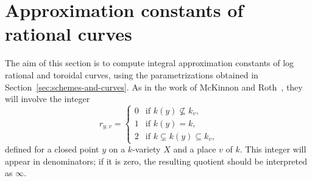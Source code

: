 \documentclass[a4paper, twoside, 11pt]{amsart}
\theoremstyle{definition}
\begin{document}
\section{Approximation constants of rational curves}\label{se:ratcurve}
The aim of this section is to compute integral approximation constants of log rational and toroidal curves, using the parametrizations obtained in Section~\ref{sec:schemes-and-curves}.
As in the work of McKinnon and Roth~\cite[Thm.~2.16]{McK-Roth}, they will involve the integer 
\begin{equation*}
	r_{y,v} = \begin{cases}
	0 & \text{if $k(y)\nsubseteq k_v$,} \\
	1 & \text{if $k(y) = k$,} \\
	2 & \text{if $k\subsetneq k(y) \subseteq k_v$,}
	\end{cases}
\end{equation*}
defined for a closed point $y$ on a $k$-variety $X$ and a place $v$ of $k$. This integer will appear in denominators; if it is zero, the resulting quotient should be interpreted as $\infty$.
 
\end{document}

